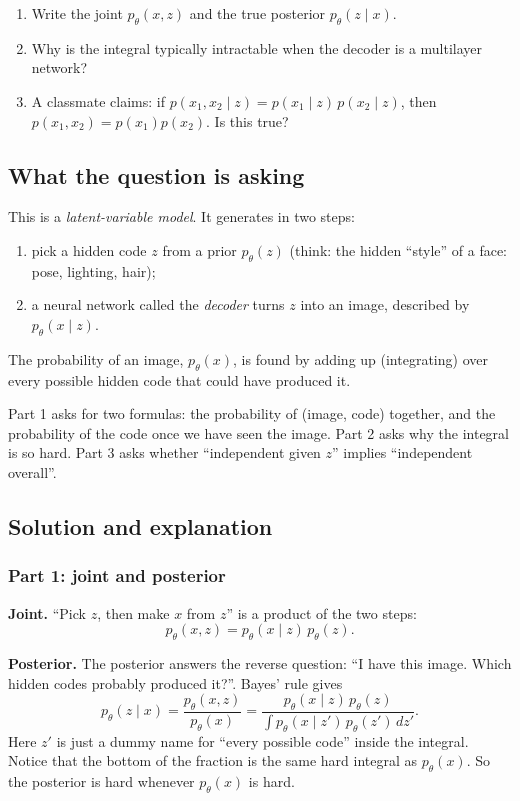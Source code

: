 \documentclass[12pt,a4paper]{article}
\begin{document}
\begin{enumerate}[leftmargin=*]
\item Write the joint $p_\theta(x, z)$ and the true posterior $p_\theta(z \mid x)$.
\item Why is the integral typically intractable when the decoder is a multilayer network?
\item A classmate claims: if $p(x_1, x_2 \mid z) = p(x_1 \mid z)\, p(x_2 \mid z)$, then $p(x_1, x_2) = p(x_1)p(x_2)$. Is this true?
\end{enumerate}

\subsection{What the question is asking}

This is a \emph{latent-variable model}. It generates in two steps:
\begin{enumerate}[leftmargin=*]
\item pick a hidden code $z$ from a prior $p_\theta(z)$ (think: the hidden ``style'' of a face: pose, lighting, hair);
\item a neural network called the \emph{decoder} turns $z$ into an image, described by $p_\theta(x \mid z)$.
\end{enumerate}
The probability of an image, $p_\theta(x)$, is found by adding up (integrating) over every possible hidden code that could have produced it.

Part 1 asks for two formulas: the probability of (image, code) together, and the probability of the code once we have seen the image. Part 2 asks why the integral is so hard. Part 3 asks whether ``independent given $z$'' implies ``independent overall''.

\subsection{Solution and explanation}

\subsubsection{Part 1: joint and posterior}

\textbf{Joint.} ``Pick $z$, then make $x$ from $z$'' is a product of the two steps:
\[
p_\theta(x, z) = p_\theta(x \mid z)\, p_\theta(z).
\]

\textbf{Posterior.} The posterior answers the reverse question: ``I have this image. Which hidden codes probably produced it?''. Bayes' rule gives
\[
p_\theta(z \mid x) = \frac{p_\theta(x, z)}{p_\theta(x)} = \frac{p_\theta(x \mid z)\, p_\theta(z)}{\int p_\theta(x \mid z')\, p_\theta(z')\, dz'}.
\]
Here $z'$ is just a dummy name for ``every possible code'' inside the integral. Notice that the bottom of the fraction is the same hard integral as $p_\theta(x)$. So the posterior is hard whenever $p_\theta(x)$ is hard.
\end{document}
